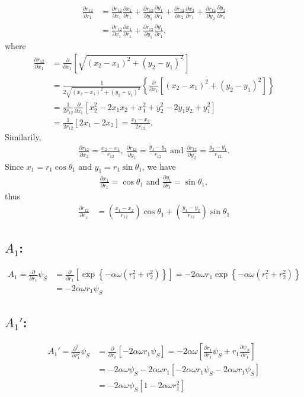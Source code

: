 \documentclass[a4paper,10pt]{article}
\newcommand{\pder}[2]{\frac{\partial #1}{\partial #2}}       %
\newcommand{\nn}{\nonumber}
\begin{document}
\begin{align}
\pder{r_{12}}{r_1} &= \pder{r_{12}}{x_1} \pder{x_1}{r_1} + \pder{r_{12}}{y_1}\pder{y_1}{r_1} + \pder{r_{12}}{x_2}\pder{x_2}{r_1} + \pder{r_{12}}{y_2}\pder{y_2}{r_1} \nn\\
&=  \pder{r_{12}}{x_1} \pder{x_1}{r_1} + \pder{r_{12}}{y_1}\pder{y_1}{r_1},
\end{align}
where 
\begin{align}
\pder{r_{12}}{x_1} &= \pder{}{x_1}\left[\sqrt{\left(x_2-x_1\right)^2+\left(y_2-y_1\right)^2}\right] \nn\\
&= \frac{1}{2\sqrt{\left(x_2-x_1\right)^2+\left(y_2-y_1\right)^2}} \left\{ \pder{}{x_1}\left[ \left(x_2-x_1\right)^2+\left(y_2-y_1\right)^2\right]\right\} \nn\\
&= \frac{1}{2r_{12}} \pder{}{x_1} \left[ x_2^2-2x_1x_2+x_1^2+y_2^2-2y_1y_2+y_1^2 \right] \nn\\ 
&= \frac{1}{2r_{12}} \left[2x_1 - 2x_2 \right]  =  \frac{x_1-x_2}{2r_{12}}.
\end{align}
Similarily,
\begin{align}
\pder{r_{12}}{x_2} = \frac{x_2-x_1}{r_{12}}, \ \pder{r_{12}}{y_1} = \frac{y_1-y_2}{r_{12}}\text{ and } \pder{r_{12}}{y_2}=\frac{y_2-y_1}{r_{12}}.
\end{align}
Since $x_1=r_1\cos\theta_1$ and $y_1=r_1\sin\theta_1$, we have
\begin{align}
\pder{x_1}{r_1}=\cos\theta_1\text{  and  } \pder{y_1}{r_1}=\sin\theta_1,
\end{align}
thus
\begin{align}
\pder{r_{12}}{r_1}&=\left(\frac{x_1-x_2}{r_{12}}\right)\cos\theta_1 + \left(\frac{y_1-y_2}{r_{12}}\right)\sin\theta_1
\end{align}

\noindent\makebox[\linewidth]{\rule{0.7\paperwidth}{0.4pt}}

\subsection*{$A_1$:}
\begin{align}
 A_1 = \pder{ }{r_1}\psi_S &= \pder{ }{r_1}\left[ \exp\left\{-\alpha\omega\left(r_1^2+r_2^2 \right) \right\} \right] = -2\alpha\omega r_1 \exp\left\{-\alpha\omega\left(r_1^2+r_2^2 \right) \right\} \nn\\
&= -2\alpha\omega r_1 \psi_S 
\end{align}

\subsection*{$A_1'$:}
\begin{align}
A_1' = \pder{^2}{r_1^2}\psi_S &= \pder{}{r_1} \left[ -2\alpha\omega r_1 \psi_S \right] = -2\alpha\omega \left[\pder{r_1}{r_1}\psi_S + r_1\pder{\psi_S}{r_1}\right] \nn\\
&= -2\alpha\omega \psi_S -2\alpha\omega r_1 \left[ -2\alpha\omega r_1 \psi_S -2\alpha\omega r_1 \psi_S  \right] \nn\\
&= -2\alpha\omega \psi_S \left[ 1 - 2\alpha\omega r_1^2\right]   
\end{align}
\end{document}
